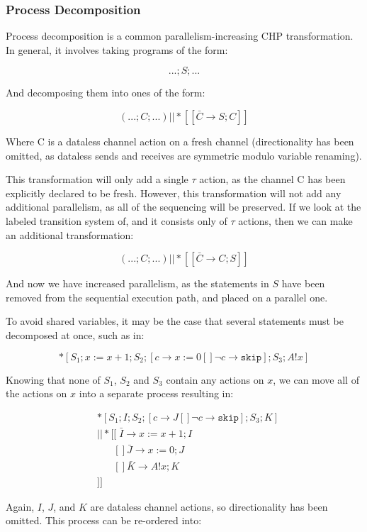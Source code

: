 \documentclass[times, 10pt]{article}
\begin{document}
\subsubsection{Process Decomposition}

Process decomposition is a common parallelism-increasing CHP transformation.  In
general, it involves taking programs of the form:

\[
...;S;...
\]

And decomposing them into ones of the form:

\[
(...;C;...) || *[[\bar{C} \rightarrow S; C]]
\]

Where C is a dataless channel action on a fresh channel (directionality has been
omitted, as dataless sends and receives are symmetric modulo variable renaming).

This transformation will only add a single $\tau$ action, as the channel C has
been explicitly declared to be fresh.  However, this transformation will not add
any additional parallelism, as all of the sequencing will be preserved. If we
look at the labeled transition system of, and it consists only of $\tau$
actions, then we can make an additional transformation:

\[
(...;C;...) || *[[\bar{C} \rightarrow C; S]]
\]

And now we have increased parallelism, as the statements in $S$ have been
removed from the sequential execution path, and placed on a parallel one.

To avoid shared variables, it may be the case that several statements must be
decomposed at once, such as in:

\[
*[S_1; x := x + 1; S_2; [ c \rightarrow x := 0 [] \lnot c \rightarrow \texttt{skip} ]; S_3; A!x ] 
\]

Knowing that none of $S_1$, $S_2$ and $S_3$ contain any actions on $x$, we can
move all of the actions on $x$ into a separate process resulting in:

\begin{align*}
& *[S_1; I; S_2; [ c \rightarrow J [] \lnot c \rightarrow \texttt{skip} ]; S_3; K] \\
& || *[[\;\bar{I} \rightarrow x := x + 1; I \\
&\;\;\;\;\;\;[] \bar{J} \rightarrow x := 0; J \\
&\;\;\;\;\;\;[] \bar{K} \rightarrow  A!x; K \\
&]]
\end{align*}

Again, $I$, $J$, and $K$ are dataless channel actions, so directionality has
been omitted. This process can be re-ordered into:
\end{document}
